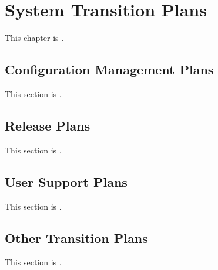 
\chapter{System Transition Plans}
\label{loc:RequiredWork}
% 

This chapter is \TBD.

\section{Configuration Management Plans}
\label{loc:STP_ConfigMngtPlans}
% 

This section is \TBD.


\section{Release Plans}
\label{loc:STP_ReleasePlans}
% 

This section is \TBD.


\section{User Support Plans}
\label{loc:STP_UserSupportPlans}
% 

This section is \TBD.


\section{Other Transition Plans}
\label{loc:STP_OtherTransitionPlans}
% 

This section is \TBD.